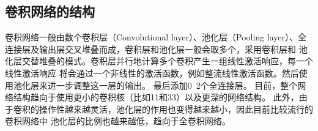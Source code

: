   
  \subsection{\hei\xiaosan\textbf{卷积网络的结构}}
    卷积\zs 网络一般由数个卷\zs 积层（Convolu\zs tional layer）、池化层\zs （Pooling 
    layer）、全连\zs 接层及输出层交叉堆叠而成，卷积层和池化层一般会取多个，采用卷积层和
    池化层交替堆叠的模式。卷积层并\zs 行地计算多个卷积产生一组线性\zs 激活响应，每一个线性激活\zs 响应
    将会通过一个非线\zs 性的激活函数，例如整流\zs 线性激活函数。然后使用池\zs 化层来进一步调\zs 整这一层的输出。
    最后添加0~2个全连接层。
    目前，整个网络结构趋向于使用更小的卷积核（比如11和33）以及更深的网络结构。
    此外，由于卷积的操作性越来越灵活，池化层的作用也变得越来越小，因此目前比较流行的卷积网络中
    池化层的比例也越来越低，趋向于全卷积网络。
    
   
